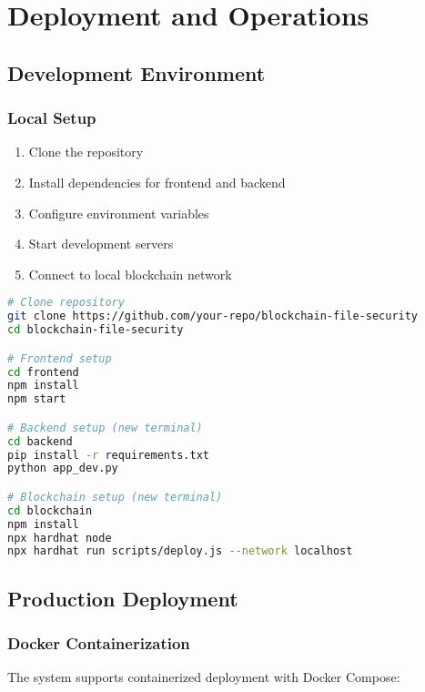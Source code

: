\documentclass[11pt,a4paper]{article}
\begin{document}
\section{Deployment and Operations}

\subsection{Development Environment}

\subsubsection{Local Setup}
\begin{enumerate}
    \item Clone the repository
    \item Install dependencies for frontend and backend
    \item Configure environment variables
    \item Start development servers
    \item Connect to local blockchain network
\end{enumerate}

\begin{lstlisting}[language=bash, caption=Development Setup Commands]
# Clone repository
git clone https://github.com/your-repo/blockchain-file-security
cd blockchain-file-security

# Frontend setup
cd frontend
npm install
npm start

# Backend setup (new terminal)
cd backend
pip install -r requirements.txt
python app_dev.py

# Blockchain setup (new terminal)
cd blockchain
npm install
npx hardhat node
npx hardhat run scripts/deploy.js --network localhost
\end{lstlisting}

\subsection{Production Deployment}

\subsubsection{Docker Containerization}
The system supports containerized deployment with Docker Compose:
\end{document}
